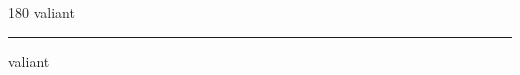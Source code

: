 
\begin{frame}
\begin{center}
\begin{turn}{180}
{\fontsize{2.5cm}{1em}\selectfont valiant}
\end{turn}
\vspace{1em}\par  
\hrule
\vspace{1em}\par  
{\fontsize{2.5cm}{1em}\selectfont valiant}
\end{center}
\end{frame}
